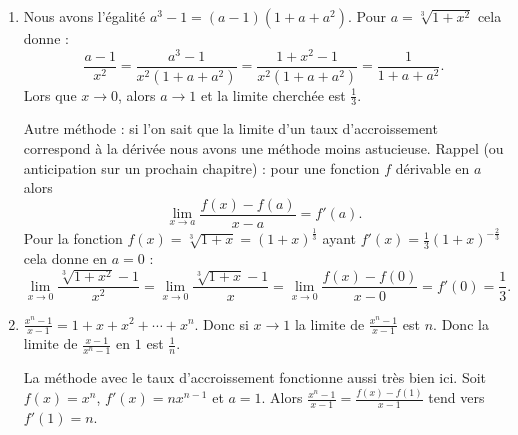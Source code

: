 {{\begin{enumerate}
  \item Nous avons l'égalité $a^3-1 = (a-1)(1+a+a^2)$. Pour $a = \sqrt[3]{1+x^2}$
cela donne :
$$\frac{a-1}{x^2} = \frac{a^3-1}{x^2(1+a+a^2)} = \frac{1+x^2-1}{x^2(1+a+a^2)} = \frac{1}{1+a+a^2}.$$
Lors que $x\to 0$, alors $a \to 1$ et la limite cherchée est $\frac 13$.

Autre méthode : si l'on sait que la limite d'un taux d'accroissement correspond à la dérivée nous avons une méthode moins
astucieuse. Rappel (ou anticipation sur un prochain chapitre) : pour une fonction $f$ dérivable en $a$ alors
$$\lim_{x\to a} \frac{f(x)-f(a)}{x-a} = f'(a).$$
Pour la fonction $f(x) = \sqrt[3]{1+x} =(1+x)^{\frac 13}$ ayant $f'(x) = \frac 13 (1+x)^{-\frac 23}$ cela donne en $a=0$ :
$$\lim_{x\to 0} \frac{\sqrt[3]{1+x^2} -1}{x^2} = \lim_{x\to 0} \frac{\sqrt[3]{1+x} -1}{x} = \lim_{x\to 0} \frac{f(x)-f(0)}{x-0} = f'(0) = \frac 13.$$

  \item $\frac{x^n-1}{x-1} = 1+x+x^2+\cdots + x^n$. Donc si $x\to 1$ la limite de  $\frac{x^n-1}{x-1}$ est  $n$.
Donc la limite de $\frac{x-1}{x^n-1}$ en $1$ est $\frac 1n$.

La méthode avec le taux d'accroissement fonctionne aussi très bien ici. Soit $f(x) = x^n$, $f'(x)=nx^{n-1}$ et $a=1$.
Alors $\frac{x^n-1}{x-1} = \frac{f(x)-f(1)}{x-1}$ tend vers $f'(1)=n$.
\end{enumerate}}
}